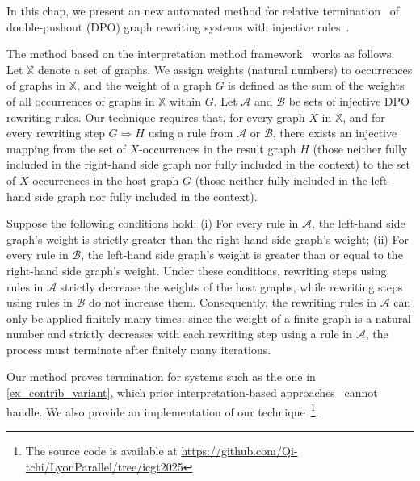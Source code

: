 
In this chap, we present an new automated method for relative termination~\cite{geser1990relative} of double-pushout (DPO) graph rewriting systems with injective rules~\cite{corradini1997algebraic,habel2001double,konig2018atutorial}. 

The method based on the interpretation method framework~\cite{nipkow1998term} works as follows. Let \( \mathbb{X} \) denote a set of graphs. We assign weights (natural numbers) to occurrences of graphs in \( \mathbb{X} \), and the weight of a graph $G$ is defined as the sum of the weights of all occurrences of graphs in \( \mathbb{X} \) within $G$. Let $\mathcal{A}$ and $\mathcal{B}$ be sets of injective DPO rewriting rules. Our technique requires that, for every graph $X$ in $\mathbb{X}$, and for every rewriting step $G \Rightarrow H$ using a rule from $\mathcal{A}$ or $\mathcal{B}$, there exists an injective mapping from the set of \( X \)-occurrences in the result graph $H$
(those neither fully included in the right-hand side graph nor fully included in the context)
 to the set of \( X \)-occurrences in the host graph $G$ (those neither fully included in the left-hand side graph nor fully included in the context).   

Suppose the following conditions hold: (i) For every rule in \( \mathcal{A} \), the left-hand side graph's weight is strictly greater than the right-hand side graph's weight; (ii) For every rule in \( \mathcal{B} \), the left-hand side graph's weight is greater than or equal to the right-hand side graph's weight. 
Under these conditions, rewriting steps using rules in \( \mathcal{A} \) strictly decrease the weights of the host graphs, while rewriting steps using rules in \( \mathcal{B} \) do not increase them.
Consequently, the rewriting rules in \( \mathcal{A} \) can only be applied finitely many times: since the weight of a finite graph is a natural number and strictly decreases with each rewriting step using a rule in \( \mathcal{A} \), the process must terminate after finitely many iterations.  

Our method proves termination for systems such as the one in \autoref{ex_contrib_variant}, which prior interpretation-based approaches~\cite{zantema2014termination,bruggink2014termination,bruggink2015proving,
endrullis2024generalized_arxiv_v2,
overbeek2024termination_lmcs} cannot handle. 
We also provide an implementation of our technique~\footnote{The source code is available at \url{https://github.com/Qi-tchi/LyonParallel/tree/icgt2025}}.  
   
